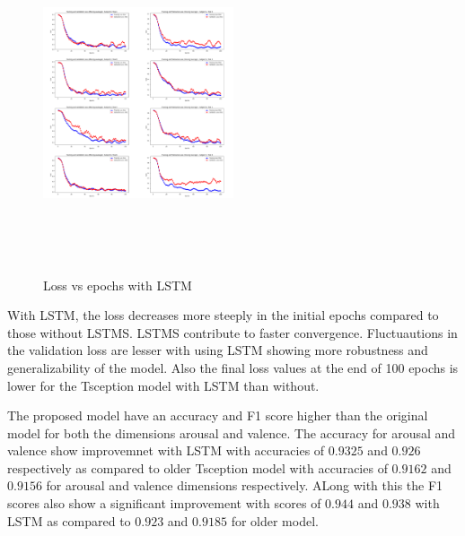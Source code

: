 \begin{figure}[h]
    \centering
    \includegraphics[width=0.5\textwidth, height =10cm]{new_combined.png} %
    \caption{Loss vs epochs with LSTM} %
    \label{loss vs epoch with LSTM} %
\end{figure}

With LSTM, the loss decreases more steeply in the initial epochs compared to those without LSTMS. LSTMS contribute to faster convergence. Fluctuautions in the validation loss are lesser with using LSTM showing more robustness and generalizability of the model. Also the final loss values at the end of 100 epochs is lower for the Tsception model with LSTM than without.

The proposed model have an accuracy and F1 score higher than the original model for both the dimensions arousal and valence. The accuracy for arousal and valence show improvemnet with LSTM with accuracies of $0.9325$ and $0.926$ respectively as compared to older Tsception model with accuracies of $0.9162$ and $0.9156$ for arousal and valence dimensions respectively. ALong with this the F1 scores also show a significant improvement with scores of $0.944$ and $0.938$ with LSTM as compared to $0.923$ and $0.9185$ for older model.


